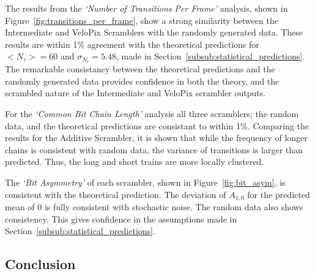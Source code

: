 			The results from the \textit{`Number of Transitions Per Frame'} analysis, shown in Figure~\ref{fig:transitions_per_frame}, show a strong similarity between the Intermediate and VeloPix Scramblers with the randomly generated data. 
			These results are within 1\% agreement with the theoretical predictions for $<N_\tau> = 60$ and $\sigma_{N_\tau} = 5.48$, made in Section~\ref{subsub:statistical_predictions}. 
			The remarkable consistancy between the theoretical predictions and the randomly generated data provides confidence in both the theory, and the scrambled nature of the Intermediate and VeloPix scrambler outputs.
			\par
			For the \textit{`Common Bit Chain Length'} analysis all three scramblers; the random data, and the theoretical predictions are consistant to within 1\%. 
			Comparing the results for the Additive Scrambler, it is shown that while the frequency of longer chains is consistent with random data, the variance of transitions is larger than predicted. 
			Thus, the long and short trains are more locally clustered. 
			\par
			The \textit{`Bit Asymmetry'} of each scrambler, shown in Figure~\ref{fig:bit_asym}, is consistent with the theoretical prediction. 
			The deviation of $A_{1,0}$ for the predicted mean of 0 is fully consistent with stochastic noise. 
			The random data also shows consistency. 
			This gives confidence in the assumptions made in Section~\ref{subsub:statistical_predictions}.		

	\subsection{Conclusion}

